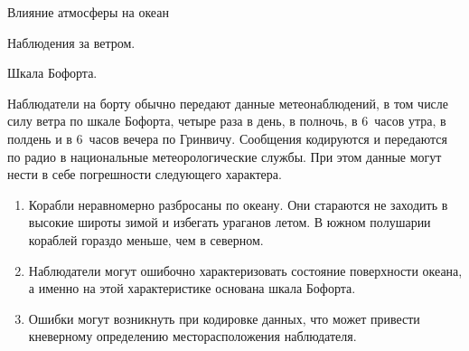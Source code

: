 \begin{chapter}{Влияние атмосферы на океан}
\begin{section}{Наблюдения за ветром.}
\begin{paragraph}{Шкала Бофорта.}


Наблюдатели на борту обычно передают данные метеонаблюдений, в том
числе силу ветра по шкале Бофорта, четыре раза в день, в полночь, в
6~часов утра, в полдень и в 6~часов вечера по Гринвичу. Сообщения
кодируются и передаются по радио в национальные метеорологические
службы. При этом данные могут нести в себе погрешности следующего
характера.

\begin{enumerate}
\item 
Корабли неравномерно разбросаны по океану. Они стараются не заходить в
высокие широты зимой и избегать ураганов летом. В южном полушарии
кораблей гораздо меньше, чем в северном.

\item
Наблюдатели могут ошибочно характеризовать состояние поверхности
океана, а именно на этой характеристике основана шкала Бофорта.

\item
Ошибки могут возникнуть при кодировке данных, что может привести
кневерному определению месторасположения наблюдателя.


\end{enumerate}
\end{paragraph}
\end{section}
\end{chapter}
